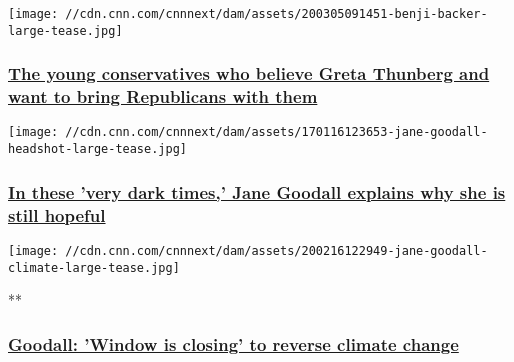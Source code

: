 \href{/2020/03/06/politics/young-green-republicans-climate-weir-wxc/index.html}{}

\texttt{[image: //cdn.cnn.com/cnnnext/dam/assets/200305091451-benji-backer-large-tease.jpg]}

\hypertarget{the-young-conservatives-who-believe-greta-thunberg-and-want-to-bring-republicans-with-them}{%
\subsubsection{\texorpdfstring{\href{/2020/03/06/politics/young-green-republicans-climate-weir-wxc/index.html}{The
young conservatives who believe Greta Thunberg and want to bring
Republicans with
them}}{The young conservatives who believe Greta Thunberg and want to bring Republicans with them}}\label{the-young-conservatives-who-believe-greta-thunberg-and-want-to-bring-republicans-with-them}}

\href{/2020/02/15/world/jane-goodall-interview-on-climate-change-trump-and-her-legacy/index.html}{}

\texttt{[image: //cdn.cnn.com/cnnnext/dam/assets/170116123653-jane-goodall-headshot-large-tease.jpg]}

\hypertarget{in-these-very-dark-times-jane-goodall-explains-why-she-is-still-hopeful}{%
\subsubsection{\texorpdfstring{\href{/2020/02/15/world/jane-goodall-interview-on-climate-change-trump-and-her-legacy/index.html}{In
these 'very dark times,' Jane Goodall explains why she is still
hopeful}}{In these 'very dark times,' Jane Goodall explains why she is still hopeful}}\label{in-these-very-dark-times-jane-goodall-explains-why-she-is-still-hopeful}}

\href{/videos/world/2020/02/16/connect-the-world-jane-goodall-climate.cnn}{}

\texttt{[image: //cdn.cnn.com/cnnnext/dam/assets/200216122949-jane-goodall-climate-large-tease.jpg]}

**

\hypertarget{goodall-window-is-closing-to-reverse-climate-change}{%
\subsubsection{\texorpdfstring{\href{/videos/world/2020/02/16/connect-the-world-jane-goodall-climate.cnn}{Goodall:
'Window is closing' to reverse climate
change}}{Goodall: 'Window is closing' to reverse climate change}}\label{goodall-window-is-closing-to-reverse-climate-change}}


